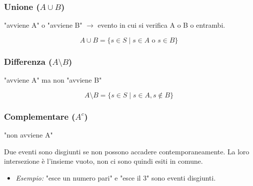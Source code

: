 \documentclass[a4paper, 11pt]{article}
\theoremstyle{definition}
\begin{document}
\subsubsection*{Unione ($A \cup B$)}
"avviene A" o "avviene B" $\rightarrow$ evento in cui si verifica A o B o entrambi.
\begin{center}
\end{center}
\[ A \cup B = \{s \in S \mid s \in A \text{ o } s \in B\} \]

\subsubsection*{Differenza ($A \setminus B$)}
"avviene A" ma non "avviene B"
\begin{center}
\end{center}
\[ A \setminus B = \{s \in S \mid s \in A, s \notin B\} \]

\subsubsection*{Complementare ($A^c$)}
"non avviene A"

\begin{tcolorbox}[colback=green!5!white, colframe=green!60!black, title=Eventi disgiunti o incompatibili]
Due eventi sono disgiunti se non possono accadere contemporaneamente. La loro intersezione è l'insieme vuoto, non ci sono quindi esiti in comune.
\begin{itemize}
    \item \textit{Esempio:} "esce un numero pari" e "esce il 3" sono eventi disgiunti.
\end{itemize}
\end{tcolorbox}
\end{document}
